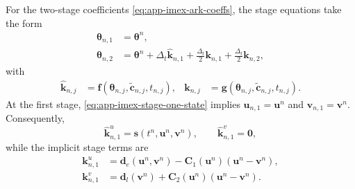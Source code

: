 For the two-stage coefficients \eqref{eq:app-imex-ark-coeffs}, the stage equations take the form
\begin{align}
    \boldsymbol{\theta}_{n,1}
     & =
    \boldsymbol{\theta}^{n},
    \label{eq:app-imex-stage-one-state} \\
    \boldsymbol{\theta}_{n,2}
     & =
    \boldsymbol{\theta}^{n}
    +
    \Delta_t \hat{\mathbf{k}}_{n,1}
    +
    \frac{\Delta_t}{2}\mathbf{k}_{n,1}
    +
    \frac{\Delta_t}{2}\mathbf{k}_{n,2},
    \label{eq:app-imex-stage-two-state}
\end{align}
with
\begin{align}
    \hat{\mathbf{k}}_{n,j}
     & =
    \mathbf{f}(\boldsymbol{\theta}_{n,j},\tilde{\mathbf{c}}_{n,j},t_{n,j}),
     &
    \mathbf{k}_{n,j}
     & =
    \mathbf{g}(\boldsymbol{\theta}_{n,j},\tilde{\mathbf{c}}_{n,j},t_{n,j}).
    \label{eq:app-imex-stage-velocities}
\end{align}
At the first stage, \eqref{eq:app-imex-stage-one-state} implies \(\mathbf{u}_{n,1}=\mathbf{u}^{n}\) and \(\mathbf{v}_{n,1}=\mathbf{v}^{n}\). Consequently,
\begin{equation}
    \hat{\mathbf{k}}^{u}_{n,1}
    =
    \mathbf{s}(t^n,\mathbf{u}^{n},\mathbf{v}^{n}),
    \qquad
    \hat{\mathbf{k}}^{v}_{n,1}
    =
    \mathbf{0},
    \label{eq:app-imex-stage-one-explicit}
\end{equation}
while the implicit stage terms are
\begin{align}
    \mathbf{k}^{u}_{n,1}
     & =
    \mathbf{d}_e(\mathbf{u}^{n},\mathbf{v}^{n})
    - \mathbf{C}_1(\mathbf{u}^{n})(\mathbf{u}^{n}-\mathbf{v}^{n}),
    \label{eq:app-imex-stage-one-implicit-u} \\
    \mathbf{k}^{v}_{n,1}
     & =
    \mathbf{d}_l(\mathbf{v}^{n})
    + \mathbf{C}_2(\mathbf{u}^{n})(\mathbf{u}^{n}-\mathbf{v}^{n}).
    \label{eq:app-imex-stage-one-implicit-v}
\end{align}

